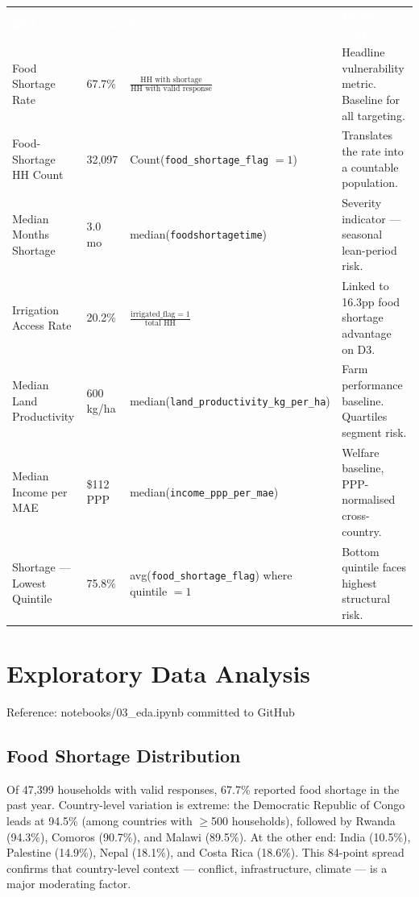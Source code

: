 \documentclass[11pt,a4paper]{article}
\newcommand{\tH}[1]{\cellcolor{rhoRed}\textcolor{white}{\textbf{#1}}}
\newcommand{\nb}[1]{\vspace{2pt}\begin{refbox}Reference: #1\end{refbox}\vspace{3pt}}
\begin{document}
{\small\setlength{\tabcolsep}{5pt}
\begin{tabularx}{\linewidth}{@{}p{3.6cm} p{1.6cm} p{4.2cm} L@{}}
  \tH{KPI} & \tH{Value} & \tH{Formula} & \tH{Business Purpose} \\
  Food Shortage Rate       & 67.7\%    & $\frac{\text{HH with shortage}}{\text{HH with valid response}}$ & Headline vulnerability metric. Baseline for all targeting. \\
  Food-Shortage HH Count   & 32,097    & Count(\texttt{food\_shortage\_flag} $= 1$) & Translates the rate into a countable population. \\
  Median Months Shortage   & 3.0 mo    & median(\texttt{foodshortagetime}) & Severity indicator — seasonal lean-period risk. \\
  Irrigation Access Rate   & 20.2\%    & $\frac{\text{irrigated\_flag} = 1}{\text{total HH}}$ & Linked to 16.3pp food shortage advantage on D3. \\
  Median Land Productivity & 600 kg/ha & median(\texttt{land\_productivity\_kg\_per\_ha}) & Farm performance baseline. Quartiles segment risk. \\
  Median Income per MAE    & \$112 PPP & {\footnotesize median(\texttt{income\_ppp\_per\_mae})} & Welfare baseline, PPP-normalised cross-country. \\
  Shortage — Lowest Quintile & 75.8\%  & avg(\texttt{food\_shortage\_flag}) where quintile $= 1$ & Bottom quintile faces highest structural risk. \\
  \bottomrule
\end{tabularx}}

\newpage

\section{Exploratory Data Analysis}

\nb{notebooks/03\_eda.ipynb committed to GitHub}

\subsection{Food Shortage Distribution}

Of 47,399 households with valid responses, 67.7\% reported food shortage in the past year. Country-level variation is extreme: the Democratic Republic of Congo leads at 94.5\% (among countries with $\geq$500 households), followed by Rwanda (94.3\%), Comoros (90.7\%), and Malawi (89.5\%). At the other end: India (10.5\%), Palestine (14.9\%), Nepal (18.1\%), and Costa Rica (18.6\%). This 84-point spread confirms that country-level context — conflict, infrastructure, climate — is a major moderating factor.
\end{document}
